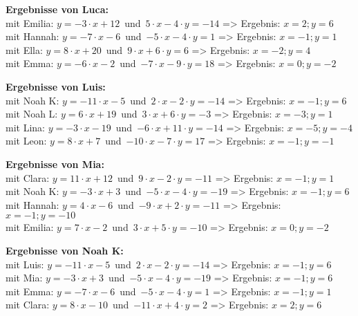 \begin{minipage}{\textwidth}
\textbf{Ergebnisse von Luca:}\\
mit Emilia: $y=-3\cdot x+12$\mbox{ }und\mbox{ }$5\cdot x-4\cdot y=-14$ => Ergebnis: $x=2;y=6$
\\
mit Hannah: $y=-7\cdot x-6$\mbox{ }und\mbox{ }$-5\cdot x-4\cdot y=1$ => Ergebnis: $x=-1;y=1$
\\
mit Ella: $y=8\cdot x+20$\mbox{ }und\mbox{ }$9\cdot x+6\cdot y=6$ => Ergebnis: $x=-2;y=4$
\\
mit Emma: $y=-6\cdot x-2$\mbox{ }und\mbox{ }$-7\cdot x-9\cdot y=18$ => Ergebnis: $x=0;y=-2$
\\
\end{minipage}
\vspace*{3ex}

\begin{minipage}{\textwidth}
\textbf{Ergebnisse von Luis:}\\
mit Noah K: $y=-11\cdot x-5$\mbox{ }und\mbox{ }$2\cdot x-2\cdot y=-14$ => Ergebnis: $x=-1;y=6$
\\
mit Noah L: $y=6\cdot x+19$\mbox{ }und\mbox{ }$3\cdot x+6\cdot y=-3$ => Ergebnis: $x=-3;y=1$
\\
mit Lina: $y=-3\cdot x-19$\mbox{ }und\mbox{ }$-6\cdot x+11\cdot y=-14$ => Ergebnis: $x=-5;y=-4$
\\
mit Leon: $y=8\cdot x+7$\mbox{ }und\mbox{ }$-10\cdot x-7\cdot y=17$ => Ergebnis: $x=-1;y=-1$
\\
\end{minipage}
\vspace*{3ex}

\begin{minipage}{\textwidth}
\textbf{Ergebnisse von Mia:}\\
mit Clara: $y=11\cdot x+12$\mbox{ }und\mbox{ }$9\cdot x-2\cdot y=-11$ => Ergebnis: $x=-1;y=1$
\\
mit Noah K: $y=-3\cdot x+3$\mbox{ }und\mbox{ }$-5\cdot x-4\cdot y=-19$ => Ergebnis: $x=-1;y=6$
\\
mit Hannah: $y=4\cdot x-6$\mbox{ }und\mbox{ }$-9\cdot x+2\cdot y=-11$ => Ergebnis: $x=-1;y=-10$
\\
mit Emilia: $y=7\cdot x-2$\mbox{ }und\mbox{ }$3\cdot x+5\cdot y=-10$ => Ergebnis: $x=0;y=-2$
\\
\end{minipage}
\vspace*{3ex}

\begin{minipage}{\textwidth}
\textbf{Ergebnisse von Noah K:}\\
mit Luis: $y=-11\cdot x-5$\mbox{ }und\mbox{ }$2\cdot x-2\cdot y=-14$ => Ergebnis: $x=-1;y=6$
\\
mit Mia: $y=-3\cdot x+3$\mbox{ }und\mbox{ }$-5\cdot x-4\cdot y=-19$ => Ergebnis: $x=-1;y=6$
\\
mit Emma: $y=-7\cdot x-6$\mbox{ }und\mbox{ }$-5\cdot x-4\cdot y=1$ => Ergebnis: $x=-1;y=1$
\\
mit Clara: $y=8\cdot x-10$\mbox{ }und\mbox{ }$-11\cdot x+4\cdot y=2$ => Ergebnis: $x=2;y=6$
\\
\end{minipage}
\vspace*{3ex}

